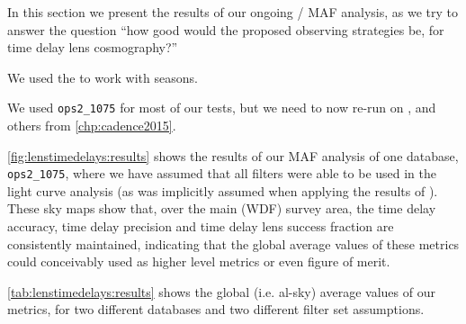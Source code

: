 
In this section we present the results of our ongoing \OpSim / MAF
analysis, as we try to
answer the question ``how good would the proposed observing
strategies be, for time delay lens cosmography?''

We used the
 to work
with seasons.

We used \texttt{ops2\_1075} for most of our tests, but we need to now
re-run on , and others from \autoref{chp:cadence2015}.


\autoref{fig:lenstimedelays:results} shows the results of our MAF
analysis of one \OpSim database, \texttt{ops2\_1075}, where we have
assumed that all filters were able to be used in the light curve
analysis (as was implicitly assumed when applying the results of
\citeauthor{LiaoEtal2015}). These sky maps show that, over the main
(WDF) survey area, the time delay accuracy, time delay precision and
time delay lens success fraction are consistently maintained,
indicating that the global average values of these metrics could
conceivably used as higher level metrics or even figure of merit.

\autoref{tab:lenstimedelays:results} shows the global (i.e. al-sky)
average values of our metrics, for two different \OpSim
databases and two different filter set assumptions.


